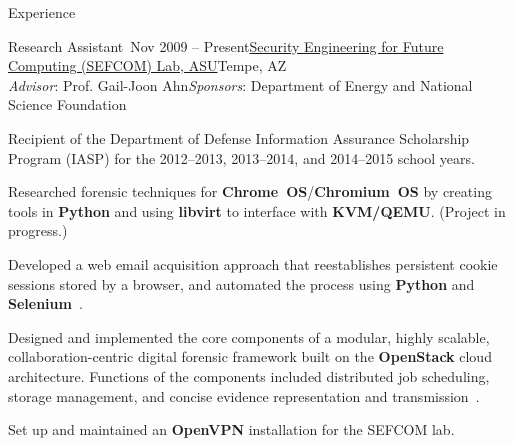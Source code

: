 \documentclass{resume} %
\begin{document}
\begin{rSection}{Experience}


\begin{rSubsection}{Research Assistant~}{Nov 2009 -- Present}{\href{http://sefcom.asu.edu/}{Security Engineering for Future Computing (SEFCOM) Lab, ASU}}{Tempe, AZ\\{\textnormal{\textit{Advisor}: Prof. Gail-Joon Ahn\hfill \textit{Sponsors}: Department of Energy and National Science Foundation}}}
	
	\item Recipient of the Department of Defense Information Assurance Scholarship Program (IASP) for the 2012--2013, 2013--2014, and 2014--2015 school years.
	
	\item Researched forensic techniques for \textbf{Chrome~OS}/\textbf{Chromium~OS} by creating tools in \textbf{Python} and using \textbf{libvirt} to interface with \textbf{KVM/QEMU}. (Project in progress.)
	
	\item Developed a web email acquisition approach that reestablishes persistent cookie sessions stored by a browser, and automated the process using \textbf{Python} and \textbf{Selenium}~\cite{Paglierani2013}.
	
	\item Designed and implemented the core components of a modular, highly scalable, collaboration-centric digital forensic framework built on the \textbf{OpenStack} cloud architecture. Functions of the components included distributed job scheduling, storage management, and concise evidence representation and transmission~\cite{Mabey2011a,Mabey2011}.
	
	\item Set up and maintained an \textbf{OpenVPN} installation for the SEFCOM lab.
		
	
	

\end{rSubsection}
\end{rSection}
\end{document}

